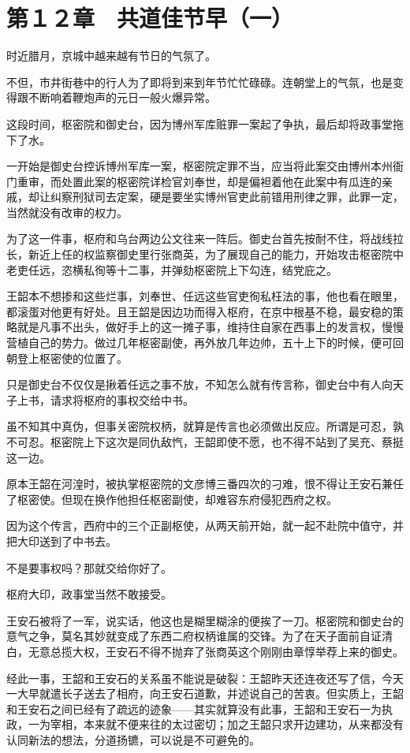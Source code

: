 \section{第１２章　共道佳节早（一）}

时近腊月，京城中越来越有节日的气氛了。

不但，市井街巷中的行人为了即将到来到年节忙忙碌碌。连朝堂上的气氛，也是变得跟不断响着鞭炮声的元日一般火爆异常。

这段时间，枢密院和御史台，因为博州军库赃罪一案起了争执，最后却将政事堂拖下了水。

一开始是御史台控诉博州军库一案，枢密院定罪不当，应当将此案交由博州本州衙门重审，而处置此案的枢密院详检官刘奉世，却是偏袒着他在此案中有瓜连的亲戚，却让纠察刑狱司去定案，硬是要坐实博州官吏此前错用刑律之罪，此罪一定，当然就没有改审的权力。

为了这一件事，枢府和乌台两边公文往来一阵后。御史台首先按耐不住，将战线拉长，新近上任的权监察御史里行张商英，为了展现自己的能力，开始攻击枢密院中老吏任远，恣横私徇等十二事，并弹劾枢密院上下勾连，结党庇之。

王韶本不想掺和这些烂事，刘奉世、任远这些官吏徇私枉法的事，他也看在眼里，都滚蛋对他更有好处。且王韶是因边功而得入枢府，在京中根基不稳，最安稳的策略就是凡事不出头，做好手上的这一摊子事，维持住自家在西事上的发言权，慢慢营植自己的势力。做过几年枢密副使，再外放几年边帅，五十上下的时候，便可回朝登上枢密使的位置了。

只是御史台不仅仅是揪着任远之事不放，不知怎么就有传言称，御史台中有人向天子上书，请求将枢府的事权交给中书。

虽不知其中真伪，但事关密院权柄，就算是传言也必须做出反应。所谓是可忍，孰不可忍。枢密院上下这次是同仇敌忾，王韶即使不愿，也不得不站到了吴充、蔡挺这一边。

原本王韶在河湟时，被执掌枢密院的文彦博三番四次的刁难，恨不得让王安石兼任了枢密使。但现在换作他担任枢密副使，却难容东府侵犯西府之权。

因为这个传言，西府中的三个正副枢使，从两天前开始，就一起不赴院中值守，并把大印送到了中书去。

不是要事权吗？那就交给你好了。

枢府大印，政事堂当然不敢接受。

王安石被将了一军，说实话，他这也是糊里糊涂的便挨了一刀。枢密院和御史台的意气之争，莫名其妙就变成了东西二府权柄谁属的交锋。为了在天子面前自证清白，无意总揽大权，王安石不得不抛弃了张商英这个刚刚由章惇举荐上来的御史。

经此一事，王韶和王安石的关系虽不能说是破裂：王韶昨天还连夜还写了信，今天一大早就遣长子送去了相府，向王安石道歉，并述说自己的苦衷。但实质上，王韶和王安石之间已经有了疏远的迹象——其实就算没有此事，王韶和王安石一为执政，一为宰相，本来就不便来往的太过密切；加之王韶只求开边建功，从来都没有认同新法的想法，分道扬镳，可以说是不可避免的。


